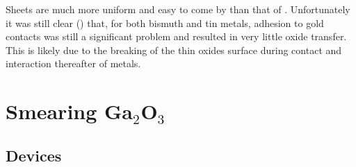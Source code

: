 \documentclass[../Matt_Gebert_Honours_Thesis.tex]{subfiles}
\begin{document}
	Sheets are much more uniform and easy to come by than that of \aluminimumoxide{}. Unfortunately it was still clear () that, for both bismuth and tin metals, adhesion to gold contacts was still a significant problem and resulted in very little oxide transfer. This is likely due to the breaking of the thin oxides surface during contact and interaction thereafter of metals.
	\begin{figure}
		
	\end{figure}
	
	
	\section{Smearing Ga$_2$O$_3$}
	
	\subsection{Devices}
	
	
	
\end{document}
